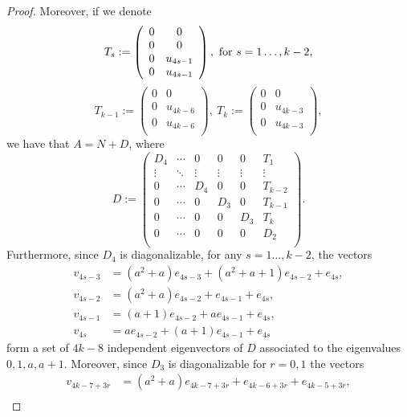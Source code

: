 \documentclass{amsart}
\theoremstyle{definition}
\theoremstyle{remark}
\numberwithin{equation}{section}
\begin{document}
\begin{proof}
Moreover, if we denote
$$T_s:=\left(
   \begin{array}{cc}
       0 &0\\
       0 &0\\
       0 &u_{4s-1}\\
       0 &u_{4s-1}\\
   \end{array}
 \right),\hbox{ for $s=1\dots, k-2$,}
$$
$$T_{k-1}:=\left(
   \begin{array}{cc}
        0 & 0\\
        0 &u_{4k-6}\\
        0 &u_{4k-6}\\
   \end{array}
 \right),\ T_{k}:=\left(
   \begin{array}{cc}
        0 & 0\\
        0 &u_{4k-3}\\
        0 &u_{4k-3}\\
   \end{array}
 \right),
 $$
we have that $A=N+D$, where
$$D:=\left(
         \begin{array}{cccccc}
           D_4 & \cdots & 0 & 0 & 0 & T_1 \\
           \vdots & \ddots & \vdots & \vdots & \vdots & \vdots \\
           0 & \cdots & D_4 & 0 & 0 & T_{k-2} \\
           0 & \cdots & 0 & D_3 & 0 & T_{k-1} \\
           0 & \cdots & 0 & 0 & D_3 & T_k \\
           0 & \cdots & 0 & 0 & 0 & D_2 \\
         \end{array}
       \right).$$
Furthermore, since $D_4$ is diagonalizable, for any $s=1\dots, k-2$, the vectors
\begin{align*}
 v_{4s-3}&=(a^2+a)e_{4s-3}+(a^2+a+1)e_{4s-2}+e_{4s},\\
 v_{4s-2}&=(a^2+a)e_{4s-2}+e_{4s-1}+e_{4s},\\
 v_{4s-1}&=(a+1)e_{4s-2}+a e_{4s-1}+e_{4s},\\
 v_{4s}&=a e_{4s-2}+(a+1) e_{4s-1}+e_{4s}
\end{align*}
form a set of $4k-8$ independent eigenvectors of $D$ associated to the eigenvalues $0,1,a,a+1$. Moreover, since $D_3$ is diagonalizable for $r=0,1$ the vectors
\begin{align*}
 v_{4k-7+3r}&=(a^2+a)e_{4k-7+3r}+e_{4k-6+3r}+e_{4k-5+3r},\\

\end{align*}
\end{proof}
\end{document}
